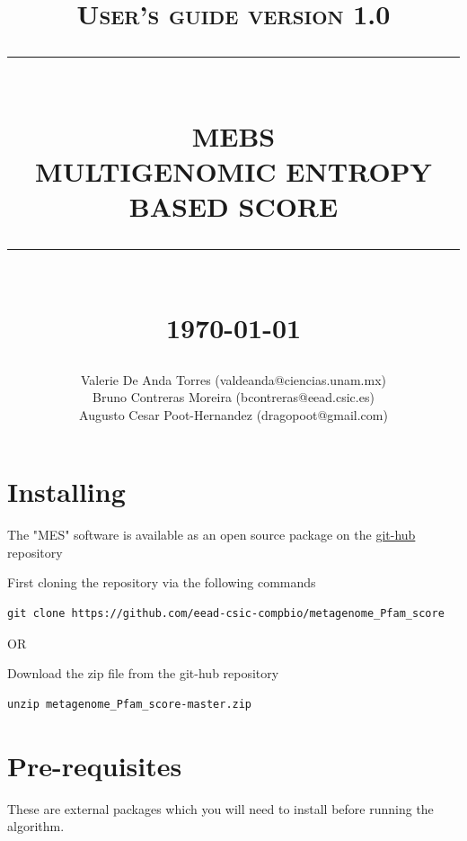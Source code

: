 \documentclass[12pt]{report}
\newcommand{\HRule}[1]{\rule{\linewidth}{#1}}
\begin{document}
\title{ \normalsize \textsc{User's guide version 1.0}
		\\ [2.0cm]
		\HRule{0.5pt} \\
		\LARGE \textbf{\uppercase{MEBS}}\\
  \textbf{\uppercase{Multigenomic Entropy based Score}}      
		\HRule{2pt} \\ [0.5cm]
		\normalsize \today \vspace*{5\baselineskip}}

\date{}

\author{
		Valerie De Anda Torres (valdeanda@ciencias.unam.mx) \\ 
		Bruno Contreras Moreira (bcontreras@eead.csic.es) \\
		Augusto Cesar Poot-Hernandez (dragopoot@gmail.com) }

\maketitle
\tableofcontents
\newpage

\sectionfont{\scshape}
\section{Installing}
The "MES" software is available as an open source package on the   \href{https://github.com/eead-csic-compbio/metagenome_Pfam_score}{git-hub} repository

First cloning the repository via the following commands

\begin{verbatim}
git clone https://github.com/eead-csic-compbio/metagenome_Pfam_score
\end{verbatim}
       
       OR 

Download the zip file from the git-hub repository 

\begin{verbatim}
unzip metagenome_Pfam_score-master.zip
\end{verbatim}

\section{Pre-requisites}
These are external packages which you will need to install before running the algorithm. 
\end{document}

